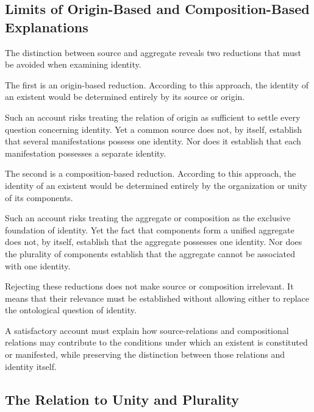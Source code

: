
\subsection{Limits of Origin-Based and Composition-Based Explanations}

The distinction between source and aggregate
reveals two reductions that must be avoided
when examining identity.

The first is an origin-based reduction.
According to this approach, the identity
of an existent would be determined entirely
by its source or origin.

Such an account risks treating the relation
of origin as sufficient to settle every
question concerning identity. Yet a common
source does not, by itself, establish
that several manifestations possess
one identity. Nor does it establish
that each manifestation possesses
a separate identity.

The second is a composition-based reduction.
According to this approach, the identity
of an existent would be determined entirely
by the organization or unity of its
components.

Such an account risks treating the
aggregate or composition as the exclusive
foundation of identity. Yet the fact
that components form a unified aggregate
does not, by itself, establish that
the aggregate possesses one identity.
Nor does the plurality of components
establish that the aggregate cannot
be associated with one identity.

Rejecting these reductions does not
make source or composition irrelevant.
It means that their relevance must be
established without allowing either
to replace the ontological question
of identity.

A satisfactory account must explain
how source-relations and compositional
relations may contribute to the conditions
under which an existent is constituted
or manifested, while preserving the
distinction between those relations
and identity itself.


\subsection{The Relation to Unity and Plurality}

